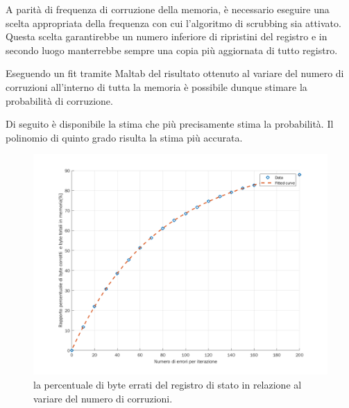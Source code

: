 \documentclass[LaM,binding=0.6cm,oneside]{../sapthesis}
\begin{document}
A parità di frequenza di corruzione della memoria, è necessario eseguire una scelta appropriata della frequenza con cui l'algoritmo di scrubbing sia attivato. Questa scelta garantirebbe un numero inferiore di ripristini del registro e in secondo luogo manterrebbe sempre una copia più aggiornata di tutto registro.

Eseguendo un fit tramite Maltab del risultato ottenuto al variare del numero di corruzioni all'interno di tutta la memoria è possibile dunque stimare la probabilità di corruzione.

Di seguito è disponibile la stima che più precisamente stima la probabilità. Il polinomio di quinto grado risulta la stima più accurata.

\begin{figure}[htbp]
\centerline{\includegraphics[scale=0.6]{examples/scrubbingTestParziali.png}}
\caption{la percentuale di byte errati del registro di stato in relazione al variare del numero di corruzioni.}
\label{fig}
\end{figure}
\vspace{0.5cm}
\newpage
\end{document}
